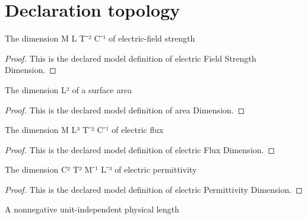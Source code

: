 \section{Declaration topology}
\begin{definition}
  \label{def:physics:phyx-mini-0841:phyxminiproblems-problemphyxmini0841-electricfieldstrengthdimension}
  The dimension M L T⁻² C⁻¹ of electric-field strength
\end{definition}
\begin{proof}
  This is the declared model definition of electric Field Strength Dimension.
\end{proof}
\begin{definition}
  \label{def:physics:phyx-mini-0841:phyxminiproblems-problemphyxmini0841-areadimension}
  The dimension L² of a surface area
\end{definition}
\begin{proof}
  This is the declared model definition of area Dimension.
\end{proof}
\begin{definition}
  \label{def:physics:phyx-mini-0841:phyxminiproblems-problemphyxmini0841-electricfluxdimension}
  The dimension M L³ T⁻² C⁻¹ of electric flux
\end{definition}
\begin{proof}
  This is the declared model definition of electric Flux Dimension.
\end{proof}
\begin{definition}
  \label{def:physics:phyx-mini-0841:phyxminiproblems-problemphyxmini0841-electricpermittivitydimension}
  The dimension C² T² M⁻¹ L⁻³ of electric permittivity
\end{definition}
\begin{proof}
  This is the declared model definition of electric Permittivity Dimension.
\end{proof}
\begin{definition}
  \label{def:physics:phyx-mini-0841:phyxminiproblems-problemphyxmini0841-lengthquantity}
  A nonnegative unit-independent physical length
\end{definition}
